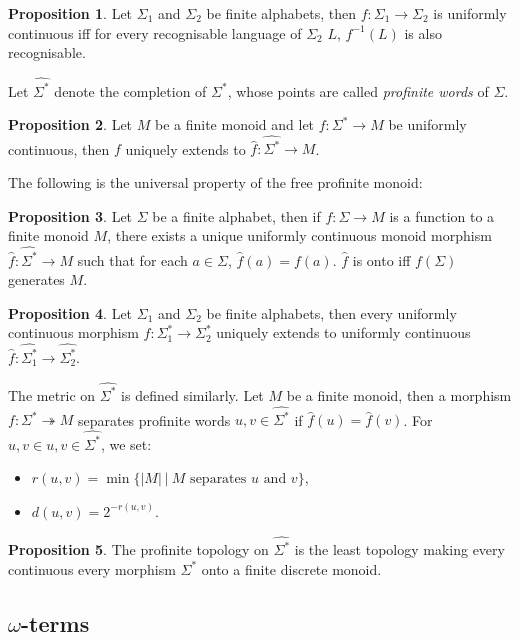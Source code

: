 \documentclass[8pt]{article}
\theoremstyle{definition}
\theoremstyle{definition}
\theoremstyle{definition}
\theoremstyle{definition}
\theoremstyle{definition}
\theoremstyle{definition}
\theoremstyle{definition}
\newtheorem{prop}{Proposition}[section]
\theoremstyle{definition}
\theoremstyle{definition}
\theoremstyle{definition}
\theoremstyle{definition}
\theoremstyle{definition}
\theoremstyle{definition}
\theoremstyle{definition}
\theoremstyle{question}
\begin{document}
\begin{prop}
  Let $\Sigma_1$ and $\Sigma_2$ be finite alphabets, then $f : \Sigma_1 \to \Sigma_2$
  is uniformly continuous iff for every recognisable language of $\Sigma_2$ $L$, $f^{-1}(L)$
  is also recognisable.
\end{prop}

Let $\widehat{\Sigma^{*}}$ denote the completion of $\Sigma^*$, whose points are called \emph{profinite words} of $\Sigma$.

\begin{prop}
  Let $M$ be a finite monoid and let $f : \Sigma^* \to M$ be uniformly continuous, then $f$ uniquely extends
  to $\widehat{f} : \widehat{\Sigma^*} \to M$.
\end{prop}
The following is the universal property of the free profinite monoid:
\begin{prop} Let $\Sigma$ be a finite alphabet, then
  if $f : \Sigma \to M$ is a function to a finite monoid $M$, there exists a unique uniformly
  continuous monoid morphism $\widehat{f} : \widehat{\Sigma^*} \to M$
  such that for each $a \in \Sigma$, $\widehat{f}(a) = f(a)$. $\widehat{f}$ is onto iff $f(\Sigma)$
  generates $M$.
\end{prop}
\begin{prop}
  Let $\Sigma_1$ and $\Sigma_2$ be finite alphabets, then every uniformly continuous morphism
  $f : \Sigma_1^* \to \Sigma_2^*$ uniquely extends to uniformly continuous 
  $\widehat{f} : \widehat{\Sigma_1^*} \to \widehat{\Sigma_2^*}$.
\end{prop}

The metric on $\widehat{\Sigma^*}$ is defined similarly. Let $M$ be a finite monoid, then
a morphism $f : \Sigma^* \twoheadrightarrow M$ separates profinite words $u, v \in \widehat{\Sigma^*}$
if $\widehat{f}(u) = \widehat{f}(v)$. For $u, v \in u, v \in \widehat{\Sigma^*}$, we set:
\begin{itemize}
  \item $r(u,v) = \min \{ |M| \: | \: \text{$M$ separates $u$ and $v$} \}$,
  \item $d(u, v) = 2^{-r(u,v)}$.
\end{itemize}
\begin{prop}
  The profinite topology on $\widehat{\Sigma^*}$ is the least topology 
  making every continuous every morphism $\Sigma^*$ onto a finite discrete monoid.
\end{prop}

\subsection{$\omega$-terms}
\end{document}

